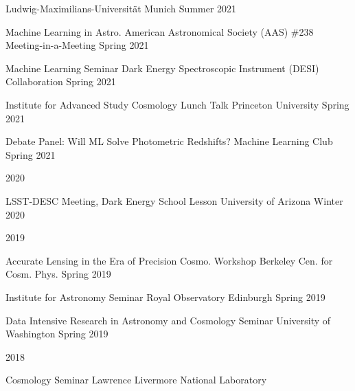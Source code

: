 \documentclass[11pt,letterpaper]{article}
\begin{document}
\begin{list}{}{\malzlist}
\begin{list}{}{\malzlist}
			{Ludwig-Maximilians-Universit{\"a}t Munich}%
		{Summer 2021}
		\item {}
		{Machine Learning in Astro.}%
	{American Astronomical Society (AAS) \#238 Meeting-in-a-Meeting}
	{Spring 2021}
	\item {}
	{Machine Learning Seminar}
	{Dark Energy Spectroscopic Instrument (DESI) Collaboration}
	{Spring 2021}
	\item {}
	{Institute for Advanced Study Cosmology Lunch Talk}
	{Princeton University}
	{Spring 2021}
	\item {}
	{Debate Panel: Will ML Solve Photometric Redshifts?}
	{Machine Learning Club}
	{Spring 2021}
\end{list}
\item 2020
\nopagebreak\begin{list}{}{\malzlist}
	\item {}
	{LSST-DESC Meeting, Dark Energy School Lesson}
	{University of Arizona}
	{Winter 2020}
\end{list}
\item 2019
\nopagebreak\begin{list}{}{\malzlist}
	\item {}
	{Accurate Lensing in the Era of Precision Cosmo. Workshop}
	{Berkeley Cen. for Cosm. Phys.}
	{Spring 2019}
	\item {}
	{Institute for Astronomy Seminar}
	{Royal Observatory Edinburgh}
	{Spring 2019}
	\item {}
	{Data Intensive Research in Astronomy and Cosmology Seminar}
	{University of Washington}
	{Spring 2019}
\end{list}
\item 2018
\nopagebreak\begin{list}{}{\malzlist}
	\item {}
	{Cosmology Seminar}
	{Lawrence Livermore National Laboratory}

\end{list}
\end{list}
\end{document}
